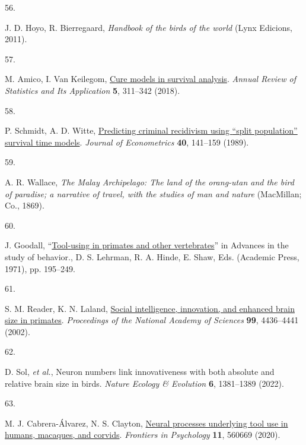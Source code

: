 \documentclass[
  man, donotrepeattitle,floatsintext]{apa6}
\newlength{\cslhangindent}
\newlength{\csllabelwidth}
\newlength{\cslentryspacingunit} %
\newenvironment{CSLReferences}[2] %
 {%
  \setlength{\parindent}{0pt}
  \ifodd #1
  \let\oldpar\par
  \def\par{\hangindent=\cslhangindent\oldpar}
  \fi
  \setlength{\parskip}{#2\cslentryspacingunit}
 }%
 {}
\newcommand{\CSLLeftMargin}[1]{\parbox[t]{\csllabelwidth}{#1}}
\newcommand{\CSLRightInline}[1]{\parbox[t]{\linewidth - \csllabelwidth}{#1}\break}
\begin{document}
\begin{CSLReferences}{0}{0}
\leavevmode{}%
\CSLLeftMargin{56. }%
\CSLRightInline{J. D. Hoyo, R. Bierregaard, \emph{Handbook of the birds of the world} (Lynx Edicions, 2011).}

\leavevmode{}%
\CSLLeftMargin{57. }%
\CSLRightInline{M. Amico, I. Van Keilegom, \href{https://doi.org/10.1146/annurev-statistics-031017-100101}{Cure models in survival analysis}. \emph{Annual Review of Statistics and Its Application} \textbf{5}, 311--342 (2018).}

\leavevmode{}%
\CSLLeftMargin{58. }%
\CSLRightInline{P. Schmidt, A. D. Witte, \href{https://doi.org/10.1016/0304-4076(89)90034-1}{Predicting criminal recidivism using {``split population''} survival time models}. \emph{Journal of Econometrics} \textbf{40}, 141--159 (1989).}

\leavevmode{}%
\CSLLeftMargin{59. }%
\CSLRightInline{A. R. Wallace, \emph{The {M}alay {A}rchipelago: The land of the orang-utan and the bird of paradise; a narrative of travel, with the studies of man and nature} (MacMillan; Co., 1869).}

\leavevmode{}%
\CSLLeftMargin{60. }%
\CSLRightInline{J. Goodall, {``\href{https://doi.org/10.1016/S0065-3454(08)60157-6}{Tool-using in primates and other vertebrates}''} in Advances in the study of behavior., D. S. Lehrman, R. A. Hinde, E. Shaw, Eds. (Academic Press, 1971), pp. 195--249.}

\leavevmode{}%
\CSLLeftMargin{61. }%
\CSLRightInline{S. M. Reader, K. N. Laland, \href{https://doi.org/10.1073/pnas.062041299}{Social intelligence, innovation, and enhanced brain size in primates}. \emph{Proceedings of the National Academy of Sciences} \textbf{99}, 4436--4441 (2002).}

\leavevmode{}%
\CSLLeftMargin{62. }%
\CSLRightInline{D. Sol, \emph{et al.}, Neuron numbers link innovativeness with both absolute and relative brain size in birds. \emph{Nature Ecology \& Evolution} \textbf{6}, 1381--1389 (2022).}

\leavevmode{}%
\CSLLeftMargin{63. }%
\CSLRightInline{M. J. Cabrera-Álvarez, N. S. Clayton, \href{https://doi.org/10.3389/fpsyg.2020.560669}{Neural processes underlying tool use in humans, macaques, and corvids}. \emph{Frontiers in Psychology} \textbf{11}, 560669 (2020).}


\end{CSLReferences}
\end{document}
